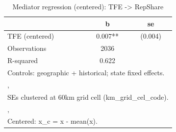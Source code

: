 \begin{table}[htbp]\centering
\def\sym#1{\ifmmode^{#1}\else\(^{#1}\)\fi}
\caption{Mediator regression (centered): TFE -> RepShare}
\begin{tabular}{l*{1}{cc}}
\toprule
                &        b   &       se\\
\midrule
TFE (centered)  &    0.007** &  (0.004)\\
\midrule
Observations    &     2036   &         \\
R-squared       &    0.622   &         \\
\bottomrule
\multicolumn{3}{l}{\footnotesize Controls: geographic + historical; state fixed effects.}\\
\multicolumn{3}{l}{\footnotesize ,}\\
\multicolumn{3}{l}{\footnotesize SEs clustered at 60km grid cell (km\_grid\_cel\_code).}\\
\multicolumn{3}{l}{\footnotesize ,}\\
\multicolumn{3}{l}{\footnotesize Centered: x\_c = x - mean(x).}\\
\end{tabular}
\end{table}
